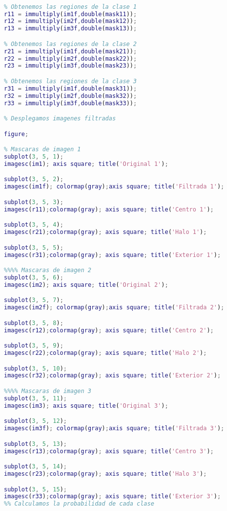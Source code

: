 \documentclass[10pt,journal,compsoc]{IEEEtran}\usepackage[T1]{fontenc}                              %
\begin{document}
\begin{lstlisting}[language=Matlab,basicstyle=\small]
% Aplicamos las mascaras a las imagenes

% Obtenemos las regiones de la clase 1
r11 = immultiply(im1f,double(mask11));
r12 = immultiply(im2f,double(mask12));
r13 = immultiply(im3f,double(mask13));

% Obtenemos las regiones de la clase 2
r21 = immultiply(im1f,double(mask21));
r22 = immultiply(im2f,double(mask22));
r23 = immultiply(im3f,double(mask23));

% Obtenemos las regiones de la clase 3
r31 = immultiply(im1f,double(mask31));
r32 = immultiply(im2f,double(mask32));
r33 = immultiply(im3f,double(mask33));

% Desplegamos imagenes filtradas

figure;

% Mascaras de imagen 1
subplot(3, 5, 1);
imagesc(im1); axis square; title('Original 1');

subplot(3, 5, 2);
imagesc(im1f); colormap(gray);axis square; title('Filtrada 1');

subplot(3, 5, 3);
imagesc(r11);colormap(gray); axis square; title('Centro 1');

subplot(3, 5, 4);
imagesc(r21);colormap(gray); axis square; title('Halo 1');

subplot(3, 5, 5);
imagesc(r31);colormap(gray); axis square; title('Exterior 1');

%%%% Mascaras de imagen 2
subplot(3, 5, 6);
imagesc(im2); axis square; title('Original 2');

subplot(3, 5, 7);
imagesc(im2f); colormap(gray);axis square; title('Filtrada 2');

subplot(3, 5, 8);
imagesc(r12);colormap(gray); axis square; title('Centro 2');

subplot(3, 5, 9);
imagesc(r22);colormap(gray); axis square; title('Halo 2');

subplot(3, 5, 10);
imagesc(r32);colormap(gray); axis square; title('Exterior 2');

%%%% Mascaras de imagen 3
subplot(3, 5, 11);
imagesc(im3); axis square; title('Original 3');

subplot(3, 5, 12);
imagesc(im3f); colormap(gray);axis square; title('Filtrada 3');

subplot(3, 5, 13);
imagesc(r13);colormap(gray); axis square; title('Centro 3');

subplot(3, 5, 14);
imagesc(r23);colormap(gray); axis square; title('Halo 3');

subplot(3, 5, 15);
imagesc(r33);colormap(gray); axis square; title('Exterior 3');
%% Calculamos la probabilidad de cada clase


\end{lstlisting}
\end{document}
